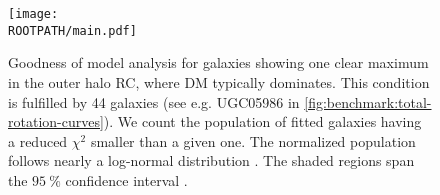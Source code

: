 \begin{figure}%
	\centering%
	\texttt{[image: \\ROOTPATH/main.pdf]}%
	\caption{Goodness of model analysis for galaxies showing one clear maximum in the outer halo RC, where DM typically dominates. This condition is fulfilled by 44 galaxies (see e.g. UGC05986 in \cref{fig:benchmark:total-rotation-curves}). We count the population of fitted galaxies having a reduced $\chi^2$ smaller than a given one. The normalized population  follows nearly a log-normal distribution . The shaded regions span the $\SI{95}{\percent}$ confidence interval .}%
	\label{fig:goodness:with-cutoff}
\end{figure}